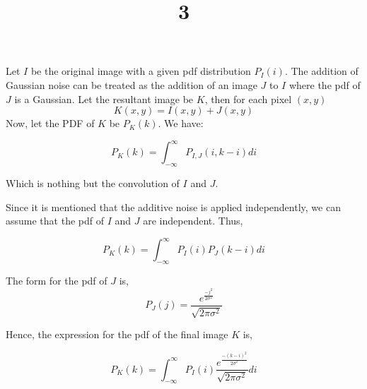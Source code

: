 \documentclass[a4paper]{article}
\title{3}
\date{}
\begin{document}
\maketitle




Let $I$ be the original image with a given pdf distribution $P_I(i)$.
The addition of Gaussian noise can be treated as the addition of an image $J$ to $I$ where the pdf of $J$ is a Gaussian.
Let the resultant image be $K$, then for each pixel $(x,y)$
\begin{equation}
K(x,y)=I(x,y)+J(x,y)     
\end{equation}
Now, let the PDF of $K$ be $P_K(k)$. We have:

\begin{equation}
    P_K(k) = \int_{-\infty}^{\infty} P_{I,J}(i,k-i)di
\end{equation}

Which is nothing but the convolution of $I$ and $J$.

Since it is mentioned that the additive noise is applied independently, we can assume that the pdf of $I$ and $J$ are independent. Thus,

\begin{equation}
    P_K(k) = \int_{-\infty}^{\infty} P_{I}(i)P_{J}(k-i)di   
\end{equation}

The form for the pdf of $J$ is,
\begin{equation}
P_J(j) = \frac{e^{\frac{-j^2}{2\sigma^2}}}{\sqrt{2\pi\sigma^2}}  
\end{equation}

Hence, the expression for the pdf of the final image $K$ is,

\begin{equation}
    P_K(k) = \int_{-\infty}^{\infty} P_{I}(i) \frac{e^{\frac{-(k-i)^2}{2\sigma^2}}}{\sqrt{2\pi\sigma^2}} di   
\end{equation}
\end{document}
